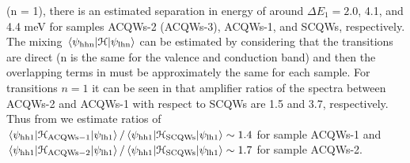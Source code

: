 (n = 1), there is an estimated separation in energy of around $\Delta E_1 = 2.0$, 4.1, and 4.4 meV for samples \gls{ACQWs}-2 (\gls{ACQWs}-3), \gls{ACQWs}-1, and \gls{SCQWs}, respectively. The mixing $\mel{\psi_{\mathrm{hhn}}}{\cal{H}}{\psi_{\mathrm{lhn}}}$ can be estimated by considering that the transitions are direct (n is the same for the valence and conduction band) and then the overlapping terms in  must be approximately the same for each sample.  For transitions $n=1$ it can be seen in  that amplifier ratios of the spectra between ACQWs-2 and ACQWs-1 with respect to \gls{SCQWs} are 1.5 and 3.7, respectively. Thus from  we estimate ratios of  $\mel{\psi_{\mathrm{hh1}}}{\cal{H}_{\mathrm{ACQWs-1}}}{\psi_{\mathrm{lh1}}}/\mel{\psi_{\mathrm{hh1}}}{\cal{H}_{\mathrm{SCQWs}}}{\psi_\mathrm{lh1}}\sim 1.4$  for sample \gls{ACQWs}-1 and $\mel{\psi_{\mathrm{hh1}}}{\cal{H}_{\mathrm{ACQWs-2}}}{\psi_{\mathrm{lh1}}}/\mel{\psi_{\mathrm{hh1}}}{\cal{H}_{\mathrm{SCQWs}}}{\psi_\mathrm{lh1}}\sim 1.7$ for sample \gls{ACQWs}-2.
